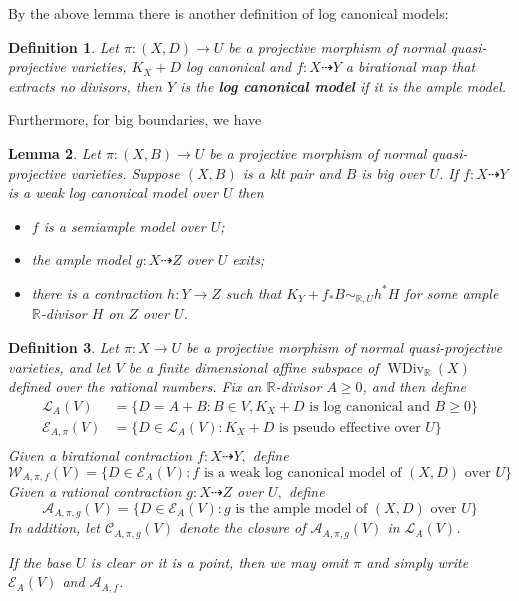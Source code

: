 \documentclass[11pt]{amsart}
\newtheorem{defn}{Definition}[section]
\newtheorem{lem}[defn]{Lemma}
\begin{document}
By the above lemma there is another definition of log canonical models:

\begin{defn}
  Let $ \pi:(X,D)\to U $ be a projective morphism of normal quasi-projective varieties, $ K_X+D $ log canonical and $ f:X\dashrightarrow Y $  a birational map that extracts no divisors, then $ Y $ is the \textbf{log canonical model} if it is the ample model. 
\end{defn}

Furthermore, for big boundaries, we have
\begin{lem}\cite[Lemma 3.9.3]{BCHM10} Let $ \pi:(X,B)\to U $ be a projective morphism of normal quasi-projective varieties. Suppose $(X,B)$ is a klt pair and  $B$ is big over $U$. If $f:X\dashrightarrow Y$ is a weak log canonical model over $U$ then
  \begin{itemize}
    \item $f$ is a semiample model over $U$;
    \item  the ample model $g:X \dashrightarrow Z$ over $U$ exits;
    \item  there is a contraction $h:Y\to Z$ such that $K_{Y}+f_*B\sim_{\mathbb{R},U} h^*H$ for some ample $\mathbb{R}$-divisor $H$ on $Z$ over $U$.   
  \end{itemize}
\end{lem}

\begin{defn}\label{polytopeofdivisor}
  \cite[Definition 1.1.4]{BCHM10} Let $ \pi:X\to U $ be a projective morphism of normal quasi-projective varieties, and  let $ V $ be a finite dimensional affine subspace of $ \operatorname{WDiv}_{\mathbb{R}}(X) $ defined over the rational numbers. Fix an $ \mathbb{R} $-divisor $ A\geqslant 0 $, and then define
  \[
    \begin{aligned}
      \mathcal{L}_A(V)&=\{D=A+B:B \in V,  K_X+D \text{ is log canonical and  } B\geqslant0 \}\\
      \mathcal{E}_{A,\pi}(V)&=\{D\in \mathcal{L}_A(V): K_X+D \text{ is pseudo effective over } U\}\\ 
    \end{aligned}
  \]
  Given a birational contraction $ f:X \dashrightarrow Y,$ define
  \[ \mathcal{W}_{A,\pi,f}(V)=\{D\in \mathcal{E}_{A}(V): f \text{ is a weak log canonical model of  } (X,D) \text{ over }U\} \]
  Given a rational contraction $g:X\dashrightarrow Z  $ over $ U, $ define
  \[ \mathcal{A}_{A,\pi,g}(V)=\{D\in \mathcal{E}_{A}(V): g \text{ is the ample model of  } (X,D) \text{ over }U\} \]
  In addition, let $ \mathcal{C}_{A,\pi,g}(V) $ denote the closure of $ \mathcal{A}_{A,\pi,g}(V) $ in $\mathcal{L}_{A}(V)$.

  If the base $U$ is clear or it is a point, then we may omit $\pi$ and simply write $\mathcal{E}_{A}(V)$ and $\mathcal{A}_{A,f}$.
\end{defn}
\end{document}

